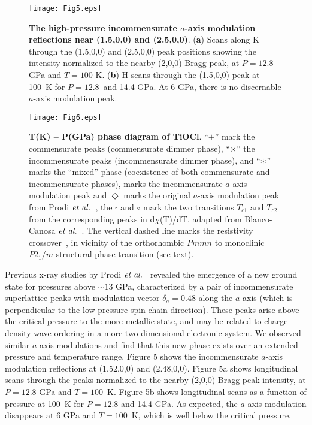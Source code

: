 \documentclass[preprint,superscriptaddress,amsmath,amssymb,aps,prl]{revtex4-1}
\begin{document}
\begin{center}
\begin{figure}
\begin{center}
\texttt{[image: Fig5.eps]}
\caption{\textbf{The high-pressure incommensurate $a$-axis modulation reflections near (1.5,0,0) and (2.5,0,0)}. (\textbf{a}) Scans along K through the (1.5,0,0) and (2.5,0,0) peak positions showing the intensity normalized to the nearby (2,0,0) Bragg peak, at $P=12.8$ GPa and $T=100$ K. (\textbf{b}) H-scans through the (1.5,0,0) peak at 100~K for $P=12.8$~and 14.4 GPa. At 6 GPa, there is no discernable $a$-axis modulation peak.}
\label{fig:Fig5}
\end{center}
\end{figure}
\end{center}

\begin{center}
\begin{figure}
\begin{center}
\texttt{[image: Fig6.eps]}
\caption{\textbf{T(K) -- P(GPa) phase diagram of TiOCl}. ``$+$'' mark the commensurate peaks (commensurate dimmer phase), ``$\times$'' the incommensurate peaks (incommensurate dimmer phase), and ``$\varhexstar$'' marks the ``mixed'' phase (coexistence of both commensurate and incommensurate phases),  marks the incommensurate $a$-axis modulation peak and $\Diamond$ marks the original $a$-axis modulation peak from Prodi $\emph{et al.}$~\cite{Prodi2010}, the {\scriptsize $\square$} and $\circ$ mark the two transitions $T_{c1}$ and $T_{c2}$ from the corresponding peaks in d$\chi$(T)/dT, adapted from Blanco-Canosa $\emph{et al.}$~\cite{Blanco2009}. The vertical dashed line marks the resistivity crossover~\cite{Forthaus2008,Kuntscher2010}, in vicinity of the orthorhombic $Pmmn$ to monoclinic $P2_{1}/m$ structural phase transition (see text).}
\label{fig:Fig6}
\end{center}
\end{figure}
\end{center}

Previous x-ray studies by Prodi $\emph{et al.}$~\cite{Prodi2010} revealed the emergence of a new ground state for pressures above $\sim13$ GPa, characterized by a pair of incommensurate superlattice peaks with modulation vector $\delta_a=0.48$ along the $a$-axis (which is perpendicular to the low-pressure spin chain direction). These peaks  arise above the critical pressure to the more metallic state, and may be related to charge density wave ordering in a more two-dimensional electronic system. We observed similar $a$-axis modulations and find that this new phase exists over an extended pressure and temperature range. Figure 5 shows the incommensurate $a$-axis modulation reflections at (1.52,0,0) and (2.48,0,0). Figure 5a shows longitudinal scans through the peaks normalized to the nearby (2,0,0) Bragg peak intensity, at $P=12.8$ GPa and $T=100$~K. Figure 5b shows longitudinal scans as a function of pressure at 100~K for $P=12.8$ and 14.4 GPa. As expected, the $a$-axis modulation disappears at 6 GPa and $T=100$~K, which is well below the critical pressure.
\end{document}
